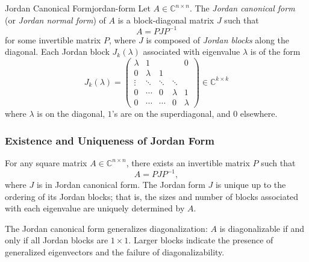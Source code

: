 \begin{definition}{Jordan Canonical Form}{jordan-form}
    Let \(A \in \mathbb{C}^{n \times n}\). The \emph{Jordan canonical form} (or \emph{Jordan normal form}) of \(A\) is a block-diagonal matrix \(J\) such that
    \[
        A = PJP^{-1}
    \]
    for some invertible matrix \(P\), where \(J\) is composed of \emph{Jordan blocks} along the diagonal. Each Jordan block \(J_k(\lambda)\) associated with eigenvalue \(\lambda\) is of the form
    \[
        J_k(\lambda) =
        \begin{pmatrix}
            \lambda & 1       &        &         & 0       \\
            0       & \lambda & 1      &         &         \\
            \vdots  & \ddots  & \ddots & \ddots  &         \\
            0       & \cdots  & 0      & \lambda & 1       \\
            0       & \cdots  & \cdots & 0       & \lambda
        \end{pmatrix}
        \in \mathbb{C}^{k \times k}
    \]
    where \(\lambda\) is on the diagonal, \(1\)'s are on the superdiagonal, and \(0\) elsewhere.
\end{definition}

\subsubsection{Existence and Uniqueness of Jordan Form}

For any square matrix \(A \in \mathbb{C}^{n \times n}\), there exists an invertible matrix \(P\) such that
\[
    A = PJP^{-1},
\]
where \(J\) is in Jordan canonical form. The Jordan form \(J\) is unique up to the ordering of its Jordan blocks; that is, the sizes and number of blocks associated with each eigenvalue are uniquely determined by \(A\).

The Jordan canonical form generalizes diagonalization: \(A\) is diagonalizable if and only if all Jordan blocks are \(1 \times 1\). Larger blocks indicate the presence of generalized eigenvectors and the failure of diagonalizability.

